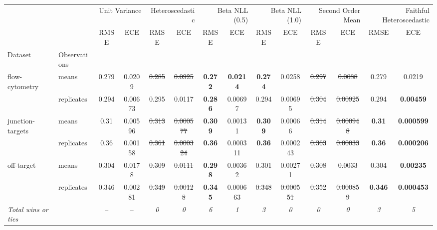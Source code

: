 \begin{tabular}{ll|cc|cc|cc|cc|cc|cc}
\toprule
{} & {} & \multicolumn{2}{r}{Unit Variance} & \multicolumn{2}{r}{Heteroscedastic} & \multicolumn{2}{r}{Beta NLL (0.5)} & \multicolumn{2}{r}{Beta NLL (1.0)} & \multicolumn{2}{r}{Second Order Mean} & \multicolumn{2}{r}{Faithful Heteroscedastic} \\
{} & {} & {RMSE} & {ECE} & {RMSE} & {ECE} & {RMSE} & {ECE} & {RMSE} & {ECE} & {RMSE} & {ECE} & {RMSE} & {ECE} \\
{Dataset} & {Observations} & {} & {} & {} & {} & {} & {} & {} & {} & {} & {} & {} & {} \\
\midrule
\multirow[t]{2}{*}{flow-cytometry} & means & 0.279 & 0.0209 & \sout{0.285} & \sout{0.0925} & \textbf{0.272} & \textbf{0.0214} & \textbf{0.274} & 0.0258 & \sout{0.297} & \sout{0.0088} & 0.279 & 0.0219 \\
 & replicates & 0.294 & 0.00673 & 0.295 & 0.0117 & \textbf{0.286} & 0.00697 & 0.294 & 0.00695 & \sout{0.304} & \sout{0.00925} & 0.294 & \textbf{0.00459} \\
\multirow[t]{2}{*}{junction-targets} & means & 0.31 & 0.00596 & \sout{0.313} & \sout{0.000577} & \textbf{0.309} & 0.00131 & \textbf{0.309} & 0.00066 & \sout{0.314} & \sout{0.000948} & \textbf{0.31} & \textbf{0.000599} \\
 & replicates & 0.36 & 0.00158 & \sout{0.361} & \sout{0.000324} & \textbf{0.36} & 0.000311 & \textbf{0.36} & 0.000243 & \sout{0.363} & \sout{0.00033} & \textbf{0.36} & \textbf{0.000206} \\
\multirow[t]{2}{*}{off-target} & means & 0.304 & 0.0178 & \sout{0.309} & \sout{0.0111} & \textbf{0.298} & 0.00362 & 0.301 & 0.00271 & \sout{0.308} & \sout{0.0033} & 0.304 & \textbf{0.00235} \\
 & replicates & 0.346 & 0.00281 & \sout{0.349} & \sout{0.00128} & \textbf{0.345} & 0.000663 & \sout{0.348} & \sout{0.000551} & \sout{0.352} & \sout{0.000859} & \textbf{0.346} & \textbf{0.000453} \\
\textit{{Total wins or ties}} &  & -- & -- & \textit{0} & \textit{0} & \textit{6} & \textit{1} & \textit{3} & \textit{0} & \textit{0} & \textit{0} & \textit{3} & \textit{5} \\
\bottomrule
\end{tabular}
